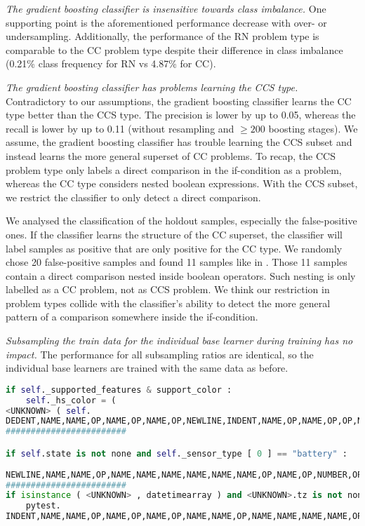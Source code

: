 \textit{The gradient boosting classifier is insensitive towards class imbalance.} One supporting point is the aforementioned performance decrease with over- or undersampling. Additionally, the performance of the RN problem type is comparable to the CC problem type despite their difference in class imbalance (0.21\% class frequency for RN vs 4.87\% for CC). 

\textit{The gradient boosting classifier has problems learning the CCS type.} Contradictory to our assumptions, the gradient boosting classifier learns the CC type better than the CCS type. The precision is lower by up to 0.05, whereas the recall is lower by up to 0.11 (without resampling and $\geq 200$ boosting stages). We assume, the gradient boosting classifier has trouble learning the CCS subset and instead learns the more general superset of CC problems. To recap, the CCS problem type only labels a direct comparison in the if-condition as a problem, whereas the CC type considers nested boolean expressions. With the CCS subset, we restrict the classifier to only detect a direct comparison. 

We analysed the classification of the holdout samples, especially the false-positive ones. If the classifier learns the structure of the CC superset, the classifier will label samples as positive that are only positive for the CC type. We randomly chose 20 false-positive samples and found 11 samples like in . Those 11 samples contain a direct comparison nested inside boolean operators. Such nesting is only labelled as a CC problem, not as CCS problem. We think our restriction in problem types collide with the classifier's ability to detect the more general pattern of a comparison somewhere inside the if-condition.


\textit{Subsampling the train data for the individual base learner during training has no impact.} The performance for all subsampling ratios are identical, so the individual base learners are trained with the same data as before.


\begin{lstlisting}[float=h, language=Python, label=lst:gbc_false_positive, caption={False-positive samples for the best performing random forest classifier with 300 boosting stages, a learning rate of 0.2, type encoding and without resampling for the CCS type. We removed spaces between tokens if necessary, but leave the intendation as in the sample.}]
    if self._supported_features & support_color : 
    self._hs_color = ( 
<UNKNOWN> ( self.
DEDENT,NAME,NAME,OP,NAME,OP,NAME,OP,NEWLINE,INDENT,NAME,OP,NAME,OP,OP,NL,NAME,OP,NAME,OP
########################

if self.state is not none and self._sensor_type [ 0 ] == "battery" : 
   
NEWLINE,NAME,NAME,OP,NAME,NAME,NAME,NAME,NAME,NAME,OP,NAME,OP,NUMBER,OP,OP,STRING,OP,NEWLINE,INDENT
########################
if isinstance ( <UNKNOWN> , datetimearray ) and <UNKNOWN>.tz is not none : 
    pytest.
INDENT,NAME,NAME,OP,NAME,OP,NAME,OP,NAME,NAME,OP,NAME,NAME,NAME,NAME,OP,NEWLINE,INDENT,NAME,OP
\end{lstlisting}

